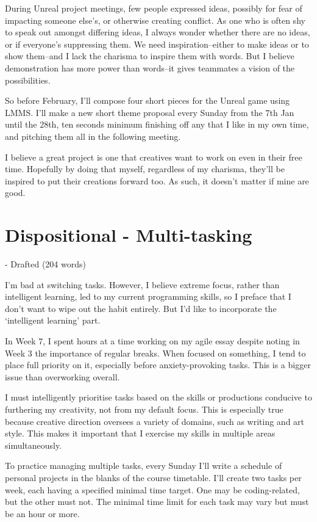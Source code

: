 \documentclass{scrartcl}
\begin{document}
During Unreal project meetings, few people expressed ideas, possibly for fear of impacting someone else's, or otherwise creating conflict. As one who is often shy to speak out amongst differing ideas, I always wonder whether there are no ideas, or if everyone's suppressing them. We need inspiration--either to make ideas or to show them--and I lack the charisma to inspire them with words. But I believe demonstration has more power than words--it gives teammates a vision of the possibilities.

So before February, I'll compose four short pieces for the Unreal game using LMMS. I'll make a new short theme proposal every Sunday from the 7th Jan until the 28th, ten seconds minimum finishing off any that I like in my own time, and pitching them all in the following meeting.

I believe a great project is one that creatives want to work on even in their free time. Hopefully by doing that myself, regardless of my charisma, they'll be inspired to put their creations forward too. As such, it doesn't matter if mine are good.

\section{Dispositional - Multi-tasking} - Drafted (204 words)

I'm bad at switching tasks. However, I believe extreme focus, rather than intelligent learning, led to my current programming skills, so I preface that I don't want to wipe out the habit entirely. But I'd like to incorporate the `intelligent learning' part.

In Week 7, I spent hours at a time working on my agile essay despite noting in Week 3 the importance of regular breaks. When focused on something, I tend to place full priority on it, especially before anxiety-provoking tasks. This is a bigger issue than overworking overall.

I must intelligently prioritise tasks based on the skills or productions conducive to furthering my creativity, not from my default focus. This is especially true because creative direction oversees a variety of domains, such as writing and art style. This makes it important that I exercise my skills in multiple areas simultaneously.

To practice managing multiple tasks, every Sunday I'll write a schedule of personal projects in the blanks of the course timetable. I'll create two tasks per week, each having a specified minimal time target. One may be coding-related, but the other must not. The minimal time limit for each task may vary but must be an hour or more.
\end{document}
